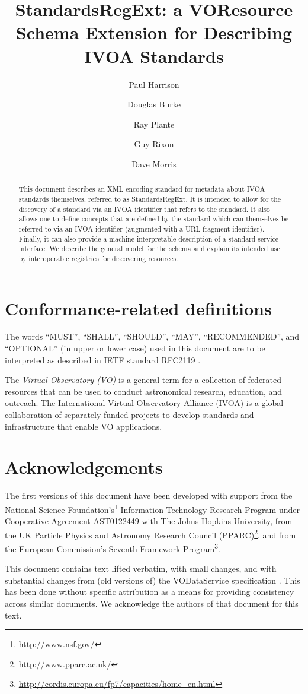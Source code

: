 \documentclass[11pt,a4paper]{ivoa}
\author[http://www.ivoa.net/twiki/bin/view/IVOA/PaulHarrison]{Paul Harrison}
\author[http://www.ivoa.net/twiki/bin/view/IVOA/DougBurke]{Douglas Burke}
\author[http://www.ivoa.net/twiki/bin/view/IVOA/RayPlante]{Ray Plante}
\author[http://www.ivoa.net/twiki/bin/view/IVOA/GuyRixon]{Guy Rixon}
\author[http://www.ivoa.net/twiki/bin/view/IVOA/DaveMorris]{Dave Morris}
\title{StandardsRegExt: a VOResource Schema Extension for Describing
IVOA Standards}
\begin{document}
\begin{abstract}
This document describes an XML encoding standard for metadata about
IVOA standards themselves, referred to as StandardsRegExt.  It is intended
to allow for the discovery of a standard via an IVOA identifier that
refers to the standard.  It also allows one to define concepts that
are defined by the standard which can themselves be referred to via an
IVOA identifier (augmented with a URL fragment identifier).  Finally,
it can also provide a machine interpretable description of a standard
service interface.  We describe the general model for the schema and
explain its intended use by interoperable registries for discovering
resources.
\end{abstract}


\section*{Conformance-related definitions}

The words ``MUST'', ``SHALL'', ``SHOULD'', ``MAY'', ``RECOMMENDED'', and
``OPTIONAL'' (in upper or lower case) used in this document are to be
interpreted as described in IETF standard RFC2119 \citep{std:RFC2119}.

The \emph{Virtual Observatory (VO)} is a
general term for a collection of federated resources that can be used
to conduct astronomical research, education, and outreach.
The \href{https://www.ivoa.net}{International
Virtual Observatory Alliance (IVOA)} is a global
collaboration of separately funded projects to develop standards and
infrastructure that enable VO applications.

\section*{Acknowledgements}

The first versions of this document have been developed with support from the
National Science Foundation's\footnote{\url{http://www.nsf.gov/}}
Information Technology Research Program under Cooperative Agreement
AST0122449 with The Johns Hopkins University, from the
UK Particle Physics and Astronomy Research Council
(PPARC)\footnote{\url{http://www.pparc.ac.uk/}}, and from the
European Commission's Seventh Framework
Program\footnote{\url{http://cordis.europa.eu/fp7/capacities/home_en.html}}.

This document contains text lifted verbatim, with small changes, and
with substantial changes from (old versions of) the VODataService
specification \citep{2021ivoa.spec.1102D}.  This
has been done without specific attribution as a means for providing
consistency across similar documents.  We acknowledge the authors of
that document for this text.
\end{document}
